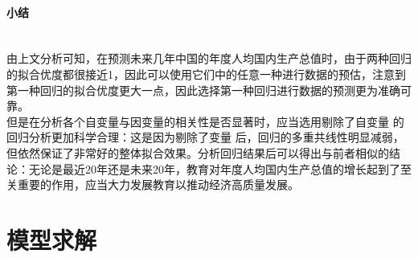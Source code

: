 \documentclass[UTF8]{article}
\begin{document}
	\paragraph{小结}
	~\\\indent
	由上文分析可知，在预测未来几年中国的年度人均国内生产总值时，由于两种回归的拟合优度都很接近1，因此可以使用它们中的任意一种进行数据的预估，注意到第一种回归的拟合优度更大一点，因此选择第一种回归进行数据的预测更为准确可靠。
	\\\indent 但是在分析各个自变量与因变量的相关性是否显著时，应当选用剔除了自变量 的回归分析更加科学合理：这是因为剔除了变量 后，回归的多重共线性明显减弱，但依然保证了非常好的整体拟合效果。分析回归结果后可以得出与前者相似的结论：无论是最近20年还是未来20年，教育对年度人均国内生产总值的增长起到了至关重要的作用，应当大力发展教育以推动经济高质量发展。
	\newpage
	\section{模型求解}
\end{document}
